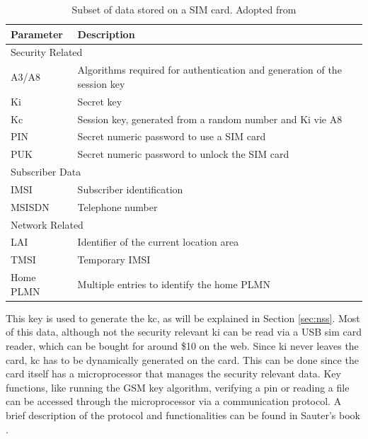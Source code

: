 \begin{table}
\centering
\begin{tabular}{@{}l>{\raggedright\arraybackslash}p{}@{}}
\toprule
Parameter		&Description\\
\midrule
\multicolumn{2}{l}{Security Related}\\
\midrule
A3/A8			&Algorithms required for authentication and generation of the session key\\
Ki				&Secret key\\
Kc				&Session key, generated from a random number and Ki vie A8\\
PIN				&Secret numeric password to use a SIM card\\
PUK				&Secret numeric password to unlock the SIM card\\
\midrule
\multicolumn{2}{l}{Subscriber Data}\\
\midrule
IMSI			&Subscriber identification\\
MSISDN			&Telephone number\\
\midrule
\multicolumn{2}{l}{Network Related}\\
\midrule
LAI				&Identifier of the current location area\\
TMSI			&Temporary IMSI\\
Home PLMN		&Multiple entries to identify the home PLMN\\
\bottomrule
\end{tabular}
\caption{Subset of data stored on a SIM card. Adopted from \cite{protocols1999}}
\label{tab:simdata}
\end{table}

This key is used to generate the \gls{kc}, as will be explained in Section \ref{sec:nss}.
Most of this data, although not the security relevant \gls{ki} can be read via a USB \gls{sim} card reader, which can be bought for around \$10 on the web.
Since \gls{ki} never leaves the card, \gls{kc} has to be dynamically generated on the card.
This can be done since the card itself has a microprocessor that manages the security relevant data.
Key functions, like running the GSM key algorithm, verifying a \gls{pin} or reading a file can be accessed through the microprocessor via a communication protocol.
A brief description of the protocol and functionalities can be found in Sauter's book \cite{kommsys2006}.

